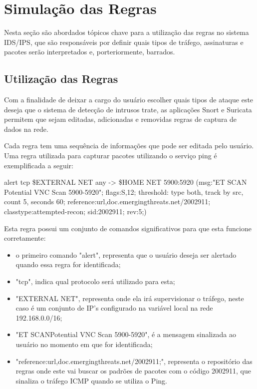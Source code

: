 \chapter{Simulação das Regras}
\label{chap:rules}

Nesta seção são abordados tópicos chave para a utilização das regras no sistema
IDS/IPS, que são responsáveis por definir quais tipos de tráfego, assinaturas e
pacotes serão interpretados e, porteriormente, barrados.

\section{Utilização das Regras}
Com a finalidade de deixar a cargo do usuário escolher quais tipos de ataque este deseja
que o sistema de detecção de intrusos trate, as aplicações Snort e Suricata permitem
que sejam editadas, adicionadas e removidas regras de captura de dados na rede.


Cada regra tem uma sequência de informações que pode ser editada pelo usuário.
Uma regra utilizada para capturar pacotes utilizando o serviço ping é exemplificada
a seguir:


\begin{framed}
alert tcp \$EXTERNAL NET any -> \$HOME NET 5900:5920 (msg:"ET SCAN
Potential VNC Scan 5900-5920"; flags:S,12; threshold: type both, track by src,
count 5, seconds 60; reference:url,doc.emergingthreats.net/2002911;
classtype:attempted-recon; sid:2002911; rev:5;)
\end{framed}

Esta regra possui um conjunto de comandos significativos para que esta funcione
corretamente:

\begin{itemize}
  \item o primeiro comando "alert", representa que o usuário deseja ser alertado quando
  essa regra for identificada;
  \item  "tcp", indica qual protocolo será utilizado para esta;
  \item "EXTERNAL NET", representa onde ela irá supervisionar o tráfego, neste caso é um
  conjunto de IP's configurado na variável local na rede 192.168.0.0/16;
  \item "ET SCANPotential VNC Scan 5900-5920", é a mensagem sinalizada ao usuário no momento
  em que for identificada;
  \item "reference:url,doc.emergingthreats.net/2002911;",
 representa o repositório das regras onde este vai buscar os padrões de pacotes
 com o código 2002911, que sinaliza o tráfego ICMP quando se utiliza o Ping.
\end{itemize}


